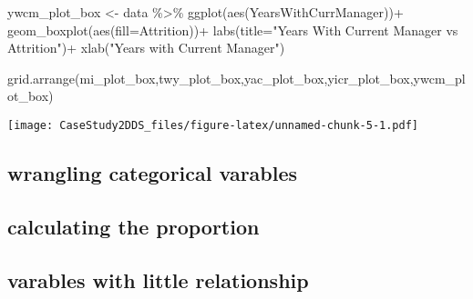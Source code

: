 \documentclass[
]{article}
\newenvironment{Shaded}{\begin{snugshade}}{\end{snugshade}}
\newcommand{\AttributeTok}[1]{\textcolor[rgb]{0.77,0.63,0.00}{#1}}
\newcommand{\FunctionTok}[1]{\textcolor[rgb]{0.00,0.00,0.00}{#1}}
\newcommand{\NormalTok}[1]{#1}
\newcommand{\OtherTok}[1]{\textcolor[rgb]{0.56,0.35,0.01}{#1}}
\newcommand{\SpecialCharTok}[1]{\textcolor[rgb]{0.00,0.00,0.00}{#1}}
\newcommand{\StringTok}[1]{\textcolor[rgb]{0.31,0.60,0.02}{#1}}
\begin{document}
\begin{Shaded}
\begin{Highlighting}[]
\NormalTok{ywcm\_plot\_box }\OtherTok{\textless{}{-}}\NormalTok{ data }\SpecialCharTok{\%\textgreater{}\%} \FunctionTok{ggplot}\NormalTok{(}\FunctionTok{aes}\NormalTok{(YearsWithCurrManager))}\SpecialCharTok{+}
  \FunctionTok{geom\_boxplot}\NormalTok{(}\FunctionTok{aes}\NormalTok{(}\AttributeTok{fill=}\NormalTok{Attrition))}\SpecialCharTok{+}
  \FunctionTok{labs}\NormalTok{(}\AttributeTok{title=}\StringTok{"Years With Current Manager vs Attrition"}\NormalTok{)}\SpecialCharTok{+}
  \FunctionTok{xlab}\NormalTok{(}\StringTok{"Years with Current Manager"}\NormalTok{)}

\FunctionTok{grid.arrange}\NormalTok{(mi\_plot\_box,twy\_plot\_box,yac\_plot\_box,yicr\_plot\_box,ywcm\_plot\_box)}
\end{Highlighting}
\end{Shaded}

\texttt{[image: CaseStudy2DDS\_files/figure-latex/unnamed-chunk-5-1.pdf]}

\hypertarget{wrangling-categorical-varables}{%
\subsection{wrangling categorical
varables}\label{wrangling-categorical-varables}}

\hypertarget{calculating-the-proportion}{%
\subsection{calculating the
proportion}\label{calculating-the-proportion}}

\hypertarget{varables-with-little-relationship}{%
\subsection{varables with little
relationship}\label{varables-with-little-relationship}}
\end{document}
